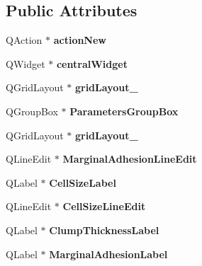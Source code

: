 \subsection*{Public Attributes}
\begin{DoxyCompactItemize}
\item 
\mbox{\label{classUi__GUIClass_a35c6c14ea01041b996f3454aa9b0d715}} 
Q\+Action $\ast$ {\bfseries action\+New}
\item 
\mbox{\label{classUi__GUIClass_a2f55de4b93fb2ad8cd15d62d722fab7f}} 
Q\+Widget $\ast$ {\bfseries central\+Widget}
\item 
\mbox{\label{classUi__GUIClass_ad8ebdb6389251700c7ff6e739d998b43}} 
Q\+Grid\+Layout $\ast$ {\bfseries grid\+Layout\+\_}
\item 
\mbox{\label{classUi__GUIClass_a0691bb4c43e7aba13b83d5d427c8e7db}} 
Q\+Group\+Box $\ast$ {\bfseries Parameters\+Group\+Box}
\item 
\mbox{\label{classUi__GUIClass_a5fae695f1e164527009a0d36998bbf5f}} 
Q\+Grid\+Layout $\ast$ {\bfseries grid\+Layout\+\_}
\item 
\mbox{\label{classUi__GUIClass_a76794c0d518c5962f2ef259631905b3f}} 
Q\+Line\+Edit $\ast$ {\bfseries Marginal\+Adhesion\+Line\+Edit}
\item 
\mbox{\label{classUi__GUIClass_a328408cec3a258c22f1e27a8176b508f}} 
Q\+Label $\ast$ {\bfseries Cell\+Size\+Label}
\item 
\mbox{\label{classUi__GUIClass_aa5460635bb1d3dfb7a96fdadf9ff4818}} 
Q\+Line\+Edit $\ast$ {\bfseries Cell\+Size\+Line\+Edit}
\item 
\mbox{\label{classUi__GUIClass_a2a7a4ec6a8edef50d78949f7d79d9b49}} 
Q\+Label $\ast$ {\bfseries Clump\+Thickness\+Label}
\item 
\mbox{\label{classUi__GUIClass_a886316f7274680822ab608648eaba5f8}} 
Q\+Label $\ast$ {\bfseries Marginal\+Adhesion\+Label}
\item 

\end{DoxyCompactItemize}
